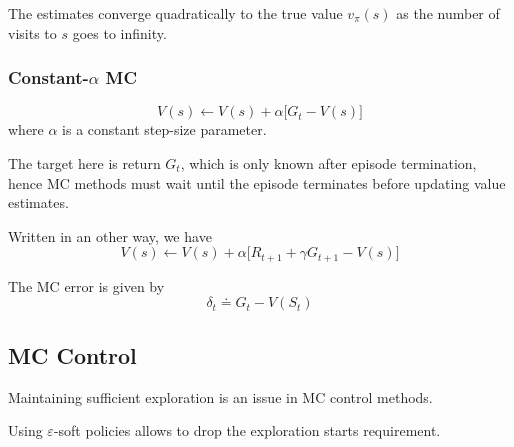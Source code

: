 The estimates converge quadratically to the true value \( v_\pi(s) \) as the number of visits to \( s \) goes to infinity.

\subsubsection{Constant-\texorpdfstring{\( \alpha \)}{alpha} MC}

\begin{equation}
    V(s) \leftarrow V(s) + \alpha \Big[ G_t - V(s) \Big]
\end{equation}
where \( \alpha \) is a constant step-size parameter.

The target here is return \( G_t \), which is only known after episode termination, hence MC methods must wait until the episode terminates before updating value estimates.

Written in an other way, we have
\begin{equation}\label{eq:mc-update-rule-2}
    V(s) \leftarrow V(s) + \alpha \Big[ R_{t+1} + \gamma G_{t+1} - V(s) \Big]
\end{equation}

The MC error is given by
\begin{equation}\label{eq:mc-error}
    \delta_t \doteq G_t - V(S_t)
\end{equation}

\subsection{MC Control}

Maintaining sufficient exploration is an issue in MC control methods.

Using \( \varepsilon \)-soft policies allows to drop the exploration starts requirement.
